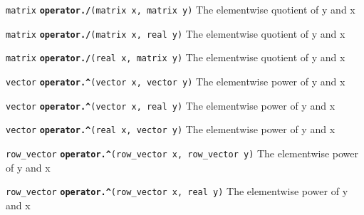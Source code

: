\documentclass[
  10pt,
]{book}
\begin{document}

\texttt{matrix} \textbf{\texttt{operator./}}\texttt{(matrix\ x,\ matrix\ y)}\newline
The elementwise quotient of y and x


\texttt{matrix} \textbf{\texttt{operator./}}\texttt{(matrix\ x,\ real\ y)}\newline
The elementwise quotient of y and x


\texttt{matrix} \textbf{\texttt{operator./}}\texttt{(real\ x,\ matrix\ y)}\newline
The elementwise quotient of y and x


\texttt{vector} \textbf{\texttt{operator.\^{}}}\texttt{(vector\ x,\ vector\ y)}\newline
The elementwise power of y and x


\texttt{vector} \textbf{\texttt{operator.\^{}}}\texttt{(vector\ x,\ real\ y)}\newline
The elementwise power of y and x


\texttt{vector} \textbf{\texttt{operator.\^{}}}\texttt{(real\ x,\ vector\ y)}\newline
The elementwise power of y and x


\texttt{row\_vector} \textbf{\texttt{operator.\^{}}}\texttt{(row\_vector\ x,\ row\_vector\ y)}\newline
The elementwise power of y and x


\texttt{row\_vector} \textbf{\texttt{operator.\^{}}}\texttt{(row\_vector\ x,\ real\ y)}\newline
The elementwise power of y and x
\end{document}
